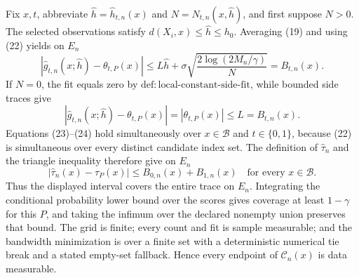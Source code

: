 Fix \(x,t\), abbreviate \(\widehat h=\widehat h_{t,n}(x)\) and \(N=N_{t,n}(x,\widehat h)\), and first suppose \(N>0\). The selected observations satisfy \(d(X_i,x)\le\widehat h\le h_0\). Averaging (19) and using (22) yields on \(E_n\)
\[
|\widehat g_{t,n}(x;\widehat h)-\theta_{t,P}(x)|
\le L\widehat h+
\sigma\sqrt{\frac{2\log(2M_n/\gamma)}N}
=B_{t,n}(x). \tag{23}
\]
If \(N=0\), the fit equals zero by \(\mathrm{def:local\text{-}constant\text{-}side\text{-}fit}\), while bounded side traces give
\[
|\widehat g_{t,n}(x;\widehat h)-\theta_{t,P}(x)|
=|\theta_{t,P}(x)|\le L=B_{t,n}(x). \tag{24}
\]
Equations (23)--(24) hold simultaneously over \(x\in\mathcal B\) and \(t\in\{0,1\}\), because (22) is simultaneous over every distinct candidate index set. The definition of \(\widehat\tau_n\) and the triangle inequality therefore give on \(E_n\)
\[
|\widehat\tau_n(x)-\tau_P(x)|
\le B_{0,n}(x)+B_{1,n}(x)
\quad\text{for every }x\in\mathcal B. \tag{25}
\]
Thus the displayed interval covers the entire trace on \(E_n\). Integrating the conditional probability lower bound over the scores gives coverage at least \(1-\gamma\) for this \(P\), and taking the infimum over the declared nonempty union preserves that bound. The grid is finite; every count and fit is sample measurable; and the bandwidth minimization is over a finite set with a deterministic numerical tie break and a stated empty-set fallback. Hence every endpoint of \(\mathcal C_n(x)\) is data measurable.

